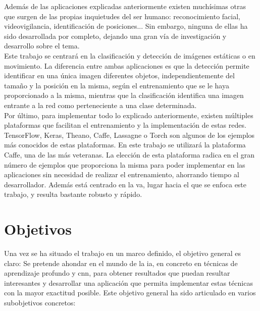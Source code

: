 Además de las aplicaciones explicadas anteriormente existen muchísimas otras que surgen de las propias inquietudes del ser humano: reconocimiento facial, videovigilancia, identificación de posiciones... Sin embargo, ninguna de ellas ha sido desarrollada por completo, dejando una gran vía de investigación y desarrollo sobre el tema.\\

Este trabajo se centrará en la clasificación y detección de imágenes estáticas o en movimiento. La diferencia entre ambas aplicaciones es que la detección permite identificar en una única imagen diferentes objetos, independientemente del tamaño y la posición en la misma, según el entrenamiento que se le haya proporcionado a la misma, mientras que la clasificación identifica una imagen entrante a la red como perteneciente a una clase determinada.\\

Por último, para implementar todo lo explicado anteriormente, existen múltiples plataformas que facilitan el entrenamiento y la implementación de estas redes. TensorFlow, Keras, Theano, Caffe, Lassagne o Torch son algunos de los ejemplos más conocidos de estas plataformas. En este trabajo se utilizará la plataforma Caffe, una de las más veteranas. La elección de esta plataforma radica en el gran número de ejemplos que proporciona la misma para poder implementar en las aplicaciones sin necesidad de realizar el entrenamiento, ahorrando tiempo al desarrollador. Además está centrado en la \acrshort{va}, lugar hacia el que se enfoca este trabajo, y resulta bastante robusto y rápido.\\


\section{Objetivos} \label{sec.objetivos}
Una vez se ha situado el trabajo en un marco definido, el objetivo general es claro: Se pretende ahondar en el mundo de la \acrshort{ia}, en concreto en técnicas de aprendizaje profundo y \acrshort{cnn}, para obtener resultados que puedan resultar interesantes y desarrollar una aplicación que permita implementar estas técnicas con la mayor exactitud posible. Este objetivo general ha sido  articulado en varios subobjetivos concretos: 

